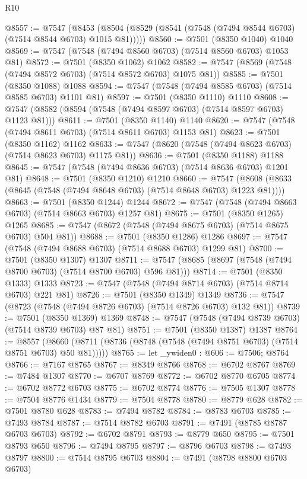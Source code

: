 \begin{lexlean}{R10}
\begin{coremodule}
@8557 := @7547
    (@8453 (@8504 (@8529 (@8541 (@7548 (@7494 @8544 @6703) (@7514 @8544 @6703) @1015 @81)))))
@8560 := @7501 (@8350 @1040) @1040
@8569 := @7547 (@7548 (@7494 @8560 @6703) (@7514 @8560 @6703) @1053 @81)
@8572 := @7501 (@8350 @1062) @1062
@8582 := @7547 (@8569 (@7548 (@7494 @8572 @6703) (@7514 @8572 @6703) @1075 @81))
@8585 := @7501 (@8350 @1088) @1088
@8594 := @7547 (@7548 (@7494 @8585 @6703) (@7514 @8585 @6703) @1101 @81)
@8597 := @7501 (@8350 @1110) @1110
@8608 := @7547 (@8582 (@8594 (@7548 (@7494 @8597 @6703) (@7514 @8597 @6703) @1123 @81)))
@8611 := @7501 (@8350 @1140) @1140
@8620 := @7547 (@7548 (@7494 @8611 @6703) (@7514 @8611 @6703) @1153 @81)
@8623 := @7501 (@8350 @1162) @1162
@8633 := @7547 (@8620 (@7548 (@7494 @8623 @6703) (@7514 @8623 @6703) @1175 @81))
@8636 := @7501 (@8350 @1188) @1188
@8645 := @7547 (@7548 (@7494 @8636 @6703) (@7514 @8636 @6703) @1201 @81)
@8648 := @7501 (@8350 @1210) @1210
@8660 := @7547 (@8608 (@8633 (@8645 (@7548 (@7494 @8648 @6703) (@7514 @8648 @6703) @1223 @81))))
@8663 := @7501 (@8350 @1244) @1244
@8672 := @7547 (@7548 (@7494 @8663 @6703) (@7514 @8663 @6703) @1257 @81)
@8675 := @7501 (@8350 @1265) @1265
@8685 := @7547 (@8672 (@7548 (@7494 @8675 @6703) (@7514 @8675 @6703) @504 @81))
@8688 := @7501 (@8350 @1286) @1286
@8697 := @7547 (@7548 (@7494 @8688 @6703) (@7514 @8688 @6703) @1299 @81)
@8700 := @7501 (@8350 @1307) @1307
@8711 := @7547 (@8685 (@8697 (@7548 (@7494 @8700 @6703) (@7514 @8700 @6703) @596 @81)))
@8714 := @7501 (@8350 @1333) @1333
@8723 := @7547 (@7548 (@7494 @8714 @6703) (@7514 @8714 @6703) @221 @81)
@8726 := @7501 (@8350 @1349) @1349
@8736 := @7547 (@8723 (@7548 (@7494 @8726 @6703) (@7514 @8726 @6703) @132 @81))
@8739 := @7501 (@8350 @1369) @1369
@8748 := @7547 (@7548 (@7494 @8739 @6703) (@7514 @8739 @6703) @87 @81)
@8751 := @7501 (@8350 @1387) @1387
@8764 := @8557
    (@8660 (@8711 (@8736 (@8748 (@7548 (@7494 @8751 @6703) (@7514 @8751 @6703) @50 @81)))))
@8765 := let _ywiden0 : @606 := @7506; @8764
@8766 := @7167 @8765
@8767 := @8349 @8766
@8768 := @6702 @8767
@8769 := @7484 @1307
@8770 := @6707 @8769
@8772 := @6702 @8770 @6705
@8774 := @6702 @8772 @6703
@8775 := @6702 @8774
@8776 := @7505 @1307
@8778 := @7504 @8776 @1434
@8779 := @7504 @8778
@8780 := @8779 @628
@8782 := @7501 @8780 @628
@8783 := @7494 @8782
@8784 := @8783 @6703
@8785 := @7493 @8784
@8787 := @7514 @8782 @6703
@8791 := @7491 (@8785 @8787 @6703 @6703)
@8792 := @6702 @8791
@8793 := @8779 @650
@8795 := @7501 @8793 @650
@8796 := @7494 @8795
@8797 := @8796 @6703
@8798 := @7493 @8797
@8800 := @7514 @8795 @6703
@8804 := @7491 (@8798 @8800 @6703 @6703)

\end{coremodule}
\end{lexlean}
